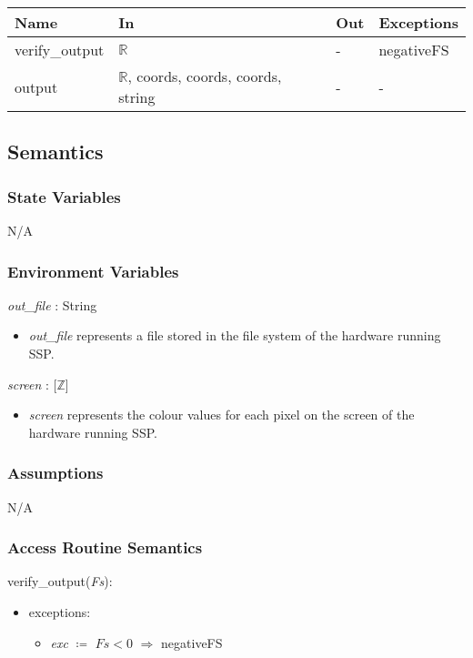\documentclass[12pt, titlepage]{article}
\newcommand{\progname}{SSP}
\begin{document}
\begin{center}
\renewcommand*{\arraystretch}{1.5}
\begin{tabular} {p{}  p{}  p{} 
p{} } \hline 
\textbf{Name} & \textbf{In} & \textbf{Out} & \textbf{Exceptions} \\ \hline
	
verify\_output & $\mathbb{R}$ & - & negativeFS \\
output & $\mathbb{R}$, coords, coords, coords, string & - & - \\ \hline
\end{tabular}
\end{center}

\subsection{Semantics}

\subsubsection{State Variables}
N/A

\subsubsection{Environment Variables}

\textit{out\_file} : String
\begin{itemize}
	\item \textit{out\_file} represents a file stored in the file system of the 
	hardware running \progname{}. \\
\end{itemize}

\textit{screen} : [$\mathbb{Z}$]
\begin{itemize}
	\item \textit{screen} represents the colour values for each pixel on the 
	screen of the hardware running \progname{}. \\
\end{itemize}

\subsubsection{Assumptions}
N/A

\subsubsection{Access Routine Semantics}
verify\_output(\textit{Fs}):
\begin{itemize}
	\item exceptions:
	\begin{itemize}
		\item[] \textit{exc} $\coloneqq$ $\textit{Fs} < 0$ 
		$\Rightarrow$ negativeFS\\
	\end{itemize}
\end{itemize}
\end{document}
